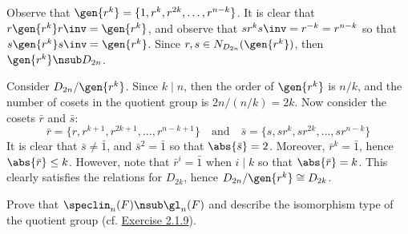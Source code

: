 \begin{solalph}
    \item Observe that $\gen{r^k} = \{1, r^k, r^{2k}, \ldots, r^{n - k}\}$. It is clear that $r\gen{r^k}r\inv = \gen{r^k}$, and observe that $sr^ks\inv = r^{-k} = r^{n - k}$ so that $s\gen{r^k}s\inv = \gen{r^k}$. Since $r, s \in N_{D_{2n}}(\gen{r^k})$, then $\gen{r^k} \nsub D_{2n}$.
    \item Consider $D_{2n}/\gen{r^k}$. Since $k \mid n$, then the order of $\gen{r^k}$ is $n/k$, and the number of cosets in the quotient group is $2n/(n/k) = 2k$. Now consider the cosets $\bar r$ and $\bar s$:
    \[\bar r = \{r, r^{k + 1}, r^{2k + 1}, \ldots, r^{n - k + 1}\} \quad \text{and} \quad \bar s = \{s, sr^k, sr^{2k}, \ldots, sr^{n - k}\}\]
    It is clear that $\bar s \neq \bar 1$, and $\bar s^2 = \bar 1$ so that $\abs{\bar s} = 2$. Moreover, $\bar r^k = \bar 1$, hence $\abs{\bar r} \leq k$. However, note that $\bar r^i = \bar 1$ when $i \mid k$ so that $\abs{\bar r} = k$. This clearly satisfies the relations for $D_{2k}$, hence $D_{2n}/\gen{r^k} \cong D_{2k}$. 
\end{solalph}

\begin{specialexercise}\label{ex3.1.35} 
    Prove that $\speclin_n(F) \nsub \gl_n(F)$ and describe the isomorphism type of the quotient group (cf. \hyperref[ex2.1.9]{Exercise 2.1.9}).
\end{specialexercise}

